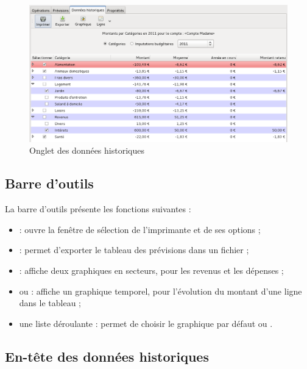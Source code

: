\ifIllustration
\begin{figure}[htbp]
\begin{center}
\includegraphics[scale=0.5]{image/screenshot/budget_historical_data}
\end{center}
\caption{Onglet des données historiques}
\label{budget-historicalData-img}
\end{figure}
\fi


\subsection{Barre d'outils\label{budget-data-functions}}

La barre d'outils présente les fonctions suivantes : 
\begin{itemize}
	 \item {} : ouvre la fenêtre de sélection de l'imprimante et de ses options ;
	 \item {} : permet d'exporter le tableau des prévisions dans un fichier ;
	 \item {} : affiche deux graphiques en secteurs, pour les revenus et les dépenses ;
	 \item {} ou  : affiche un graphique temporel, pour l'évolution du montant d'une ligne dans le tableau ;
	 \item une liste déroulante : permet de choisir le graphique par défaut  ou .	 
\end{itemize}

\ifIllustration
\newpage
\fi

\subsection{En-tête des données historiques\label{budget-data-source}}

